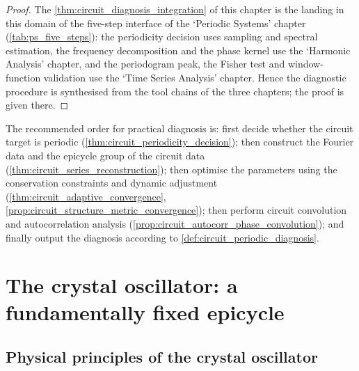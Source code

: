 \begin{proof}
The \cref{thm:circuit_diagnosis_integration} of this chapter is the landing in this domain of the five-step interface of the `Periodic Systems' chapter (\cref{tab:ps_five_steps}):
the periodicity decision uses sampling and spectral estimation, the frequency decomposition and the phase kernel use the `Harmonic Analysis' chapter, and the periodogram peak, the Fisher test and
window-function validation use the `Time Series Analysis' chapter. Hence the diagnostic procedure is synthesised from the tool chains of the three chapters; the proof is given there.
\end{proof}

\begin{remark}\label{rem:circuit_integration_order}
The recommended order for practical diagnosis is: first decide whether the circuit target is periodic (\cref{thm:circuit_periodicity_decision}); then construct the Fourier data and the epicycle group of the circuit data (\cref{thm:circuit_series_reconstruction}); then optimise the parameters using the conservation constraints and dynamic adjustment (\cref{thm:circuit_adaptive_convergence}, \cref{prop:circuit_structure_metric_convergence}); then perform circuit convolution and autocorrelation analysis (\cref{prop:circuit_autocorr_phase_convolution}); and finally output the diagnosis according to \cref{def:circuit_periodic_diagnosis}.
\end{remark}

\section{The crystal oscillator: a fundamentally fixed epicycle}

\subsection{Physical principles of the crystal oscillator}

